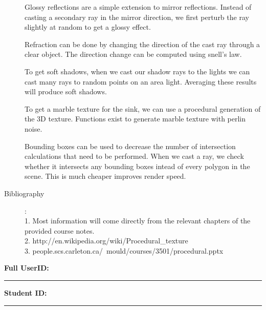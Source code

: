 \documentclass {article}
\begin{document}
\begin{description}
        Glossy reflections are a simple extension to mirror reflections.
        Instead of casting a secondary ray in the mirror direction, we first
        perturb the ray slightly at random to get a glossy effect.

        Refraction can be done by changing the direction of the cast ray through
        a clear object.  The direction change can be computed using snell's law.

        To get soft shadows, when we cast our shadow rays to the lights we can
        cast many rays to random points on an area light.  Averaging these
        results will produce soft shadows.

        To get a marble texture for the sink, we can use a procedural generation
        of the 3D texture.  Functions exist to generate marble texture with
        perlin noise.

        Bounding boxes can be used to decrease the number of intersection
        calculations that need to be performed.  When we cast a ray, we check
        whether it intersects any bounding boxes intead of every polygon in the
        scene.  This is much cheaper improves render speed.

\item[Bibliography]:\\
        1. Most information will come directly from the relevant chapters of the
        provided course notes.\\
        2. http://en.wikipedia.org/wiki/Procedural\_texture\\
        3. people.scs.carleton.ca/~mould/courses/3501/procedural.pptx\\

\end{description}
\newpage



{\hfill{\bf Full UserID:\rule{2in}{.1mm}}\hfill{\bf Student ID:\rule{2in}{.1mm}}\hfill}
\end{document}
